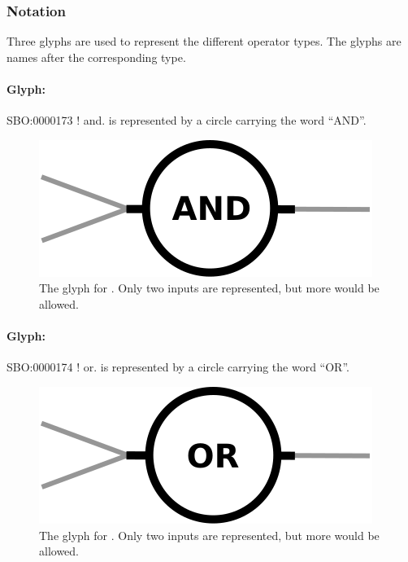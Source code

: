\subsubsection{Notation}

Three glyphs are used to represent the different operator types. The
glyphs are names after the corresponding type.

\paragraph{Glyph: }\label{sec:techref:and}

\begin{glyphDescription}
 \glyphSboTerm SBO:0000173 ! and.
 \glyphNode {} is represented by a circle carrying the word ``AND''.
\end{glyphDescription}

\begin{figure}[htb]
  \centering
  \includegraphics[scale = 0.5]{images/and}
  \caption{The \PD glyph for . Only two inputs are represented, but more would be allowed.}
  \label{fig:techref:and}
\end{figure}


\paragraph{Glyph: }\label{sec:techref:or}

\begin{glyphDescription}
 \glyphSboTerm SBO:0000174 ! or.
 \glyphNode {} is represented by a circle carrying the word ``OR''.
 \end{glyphDescription}

\begin{figure}[htb]
  \centering
  \includegraphics[scale = 0.5]{images/or}
  \caption{The \PD glyph for . Only two inputs are represented, but more would be allowed.}
  \label{fig:techref:or}
\end{figure}


